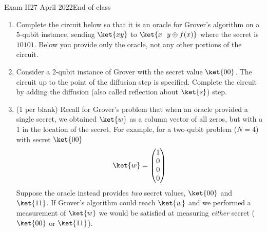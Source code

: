 \documentclass[12pt]{article}
\begin{document}
\begin{assignment}{Exam II}{27 April 2022}{End of class}
\begin{enumerate}
\clearpage\item{}
Complete the circuit below so that it is an oracle for Grover's algorithm on a 5-qubit instance, sending $\ket{xy}$ to $\ket{x\ \  y\oplus f(x)}$ where the secret is $10101$.  Below you provide only the oracle, not any other portions of the circuit.


\item{}
Consider a 2-qubit instance of Grover with the secret value $\ket{00}$.  The circuit up to the point of the diffusion step is specified.  Complete the circuit by adding the diffusion (also called reflection about $\ket{s}$) step.


\clearpage\item{} (1 per blank)
Recall for Grover's problem that when an oracle provided a single secret, we obtained $\ket{w}$ as a column vector of all zeros, but with a 1 in the location of the secret.   For example, for a two-qubit problem ($N=4$) with secret $\ket{00}$ 
\[ \ket{w} = \begin{pmatrix} 1 \\ 0 \\ 0 \\ 0\end{pmatrix} \]
Suppose the oracle instead provides \emph{two} secret values, $\ket{00}$ and $\ket{11}$.  If Grover's algorithm could reach $\ket{w}$ and we performed a measurement of $\ket{w}$ we would be satisfied at measuring \emph{either} secret ($\ket{00}$ or $\ket{11}$).


\end{enumerate}
\end{assignment}
\end{document}
